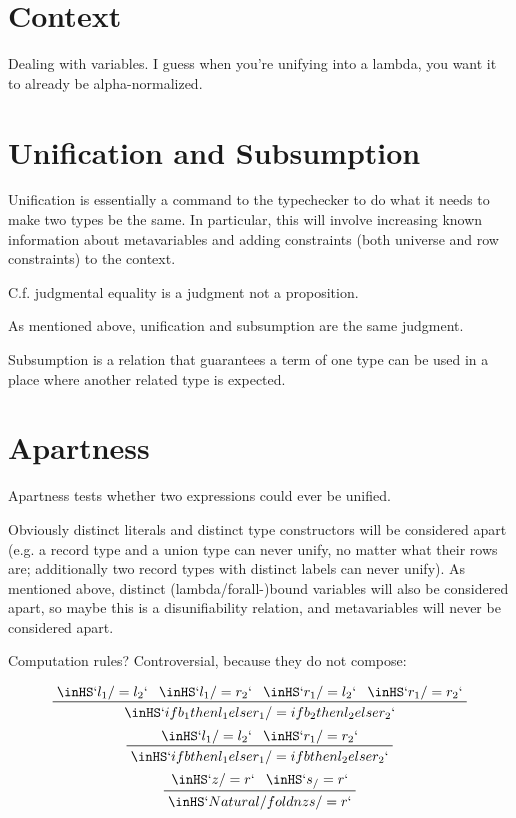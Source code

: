 \documentclass[11pt, twoside, reqno]{book}
\begin{document}
\section{Context}

Dealing with variables.
I guess when you're unifying into a lambda, you want it to already be alpha-normalized.

\section{Unification and Subsumption}
Unification is essentially a command to the typechecker to do what it needs to make two types be the same.
In particular, this will involve increasing known information about metavariables and adding constraints (both universe and row constraints) to the context.

C.f. judgmental equality is a judgment not a proposition.

As mentioned above, unification and subsumption are the same judgment.

Subsumption is a relation that guarantees a term of one type can be used in a place where another related type is expected.

\section{Apartness}
Apartness tests whether two expressions could ever be unified.

Obviously distinct literals and distinct type constructors will be considered apart (e.g. a record type and a union type can never unify, no matter what their rows are; additionally two record types with distinct labels can never unify).
As mentioned above, distinct (lambda/forall-)bound variables will also be considered apart, so maybe this is a disunifiability relation, and metavariables will never be considered apart.

Computation rules?
Controversial, because they do not compose:

\begin{displaymath}
\prftree{\inHS`l_1 /= l_2`}{\inHS`l_1 /= r_2`}{\inHS`r_1 /= l_2`}{\inHS`r_1 /= r_2`}{\inHS`if b_1 then l_1 else r_1 /= if b_2 then l_2 else r_2`}
\end{displaymath}
\begin{displaymath}
\prftree{\inHS`l_1 /= l_2`}{\inHS`r_1 /= r_2`}{\inHS`if b then l_1 else r_1 /= if b then l_2 else r_2`}
\end{displaymath}
\begin{displaymath}
\prftree{\inHS`z /= r`}{\inHS`s _ /= r`}{\inHS`Natural/fold n z s /= r`}
\end{displaymath}
\end{document}
